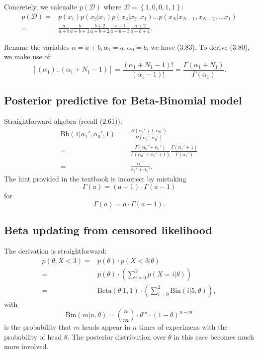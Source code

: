 \documentclass[UTF8]{ctexart}
\begin{document}
Concretely, we calcualte $p(\mathcal{D})$ where $\mathcal{D}=\left\{1,0,0,1,1\right\}$:
\begin{align}
p(\mathcal{D})=&p(x_{1})p(x_{2}|x_{1})p(x_{3}|x_{2},x_{1})...p(x_{N}|x_{N-1},x_{N-2},...x_{1})\nonumber \\
=&\frac{a}{a+b}\frac{b}{a+b+1}\frac{b+2}{a+b+2}\frac{a+1}{a+b+3}\frac{a+2}{a+b+4}. \nonumber
\end{align}


Rename the variables $\alpha=a+b,\alpha_{1}=a,\alpha_{0}=b$, we have (3.83). To derive (3.80), we make use of:
$$[(\alpha_{1})..(\alpha_{1}+N_{1}-1)] = \frac{(\alpha_{1}+N_{1}-1)!}{(\alpha_{1}-1)!}=\frac{\Gamma(\alpha_{1}+N_{1})}{\Gamma(\alpha_{1})}.$$

\subsection{Posterior predictive for Beta-Binomial model}
Straightforward algebra (recall (2.61)):
\begin{align}
\text{Bb}(1|\alpha_{1}',\alpha_{0}',1)=&\frac{B(\alpha_{1}'+1,\alpha_{0}')}{B(\alpha_{1}',\alpha_{0}')} \nonumber \\
=&\frac{\Gamma(\alpha_{0}'+\alpha_{1}')}{\Gamma(\alpha_{0}'+\alpha_{1}'+1)}\frac{\Gamma(\alpha_{1}'+1)}{\Gamma(\alpha_{1}')} \nonumber \\
=&\frac{\alpha_{1}'}{\alpha_{1}'+\alpha_{0}'}. \nonumber
\end{align}
The hint provided in the textbook is incorrect by mistaking
$$\Gamma(a)=(a-1)\cdot\Gamma(a-1)$$
for 
$$\Gamma(a)=a\cdot\Gamma(a-1).$$


\subsection{Beta updating from censored likelihood}
The derivation is straightforward:
$$
\begin{aligned}
p(\theta,X < 3) =& p(\theta)\cdot p(X < 3| \theta) \\
=& p(\theta)\cdot \left(\sum_{i=0}^{2}p(X=i|\theta)\right) \\
=&\text{Beta}(\theta|1,1)\cdot \left(\sum_{i=0}^{2}\text{Bin}(i|5,\theta)\right),
\end{aligned}
$$
with 
$$\text{Bin}(m|n,\theta)=\binom{n}{m}\cdot \theta^{m}\cdot(1-\theta)^{n-m}$$
is the probability that $m$ heads appear in $n$ times of experimens with the probability of head $\theta$. 
The posterior distribution over $\theta$ in this case becomes much more involved. 
\end{document}
